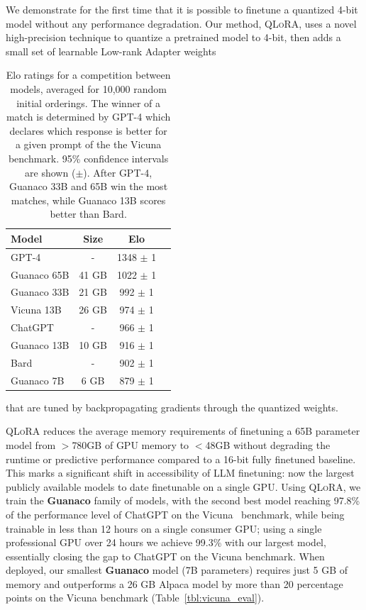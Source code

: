 We demonstrate for the first time that it is possible to finetune a quantized 4-bit model without any performance degradation. Our method, \textsc{QLoRA}, uses a novel high-precision technique to quantize a pretrained model to 4-bit, then adds a small set of learnable Low-rank Adapter weights \citep{hu2021lora}

\begin{table}
\centering

\caption{Elo ratings for a competition between models, averaged for 10,000 random initial orderings. The winner of a match is determined by GPT-4 which declares which response is better for a given prompt of the the Vicuna benchmark. 95\% confidence intervals are shown ($\pm$). After GPT-4, Guanaco 33B and 65B win the most matches, while Guanaco 13B scores better than Bard.}
\label{tbl:elo}
\begin{tabular}{lccr}\toprule
Model & Size & Elo \\\midrule
GPT-4 & - & 1348 $\pm$ 1 \\
Guanaco 65B & 41 GB & 1022 $\pm$ 1 \\
Guanaco 33B & 21 GB & \hspace{1.75mm}992 $\pm$ 1 \\
Vicuna 13B & 26 GB & \hspace{1.75mm}974 $\pm$  1\\
ChatGPT & - & \hspace{1.75mm}966  $\pm$ 1 \\
Guanaco 13B & 10 GB & \hspace{1.75mm}916 $\pm$ 1 \\
Bard & - & \hspace{1.75mm}902 $\pm$ 1 \\
Guanaco 7B & 6 GB & \hspace{1.75mm}879 $\pm$ 1\\\bottomrule
\end{tabular}

\end{table}

that are tuned by backpropagating gradients through the quantized weights. 

\textsc{QLoRA} reduces the average memory requirements of finetuning a 65B parameter model from $>$780GB of GPU memory to $<$48GB without degrading the runtime or predictive performance compared to a 16-bit fully finetuned baseline. This marks a significant shift in accessibility of LLM finetuning: now the largest publicly available models to date finetunable on a single GPU. Using \textsc{QLoRA}, we train the \textbf{Guanaco} family of models, with the second best model reaching 97.8\% of the performance level of ChatGPT on the Vicuna~\citep{vicuna2023} benchmark, while being trainable in less than 12 hours on a single consumer GPU; using a single professional GPU over 24 hours we achieve 99.3\% with our largest model, essentially closing the gap to ChatGPT on the Vicuna benchmark. When deployed, our smallest \textbf{Guanaco} model (7B parameters) requires just 5 GB of memory and outperforms a 26 GB Alpaca model by more than 20 percentage points on the Vicuna benchmark (Table~\ref{tbl:vicuna_eval}).

